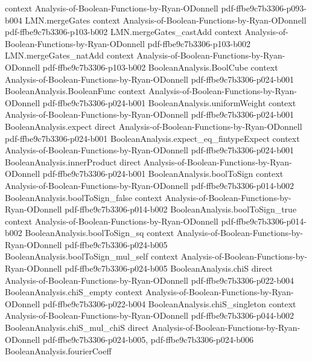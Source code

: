 \begin{lemma}
  {context}
  {Analysis-of-Boolean-Functions-by-Ryan-ODonnell}
  {pdf-ffbe9c7b3306-p093-b004}
\proofstep
  {LMN.mergeGates}
  {context}
  {Analysis-of-Boolean-Functions-by-Ryan-ODonnell}
  {pdf-ffbe9c7b3306-p103-b002}
\proofstep
  {LMN.mergeGates_castAdd}
  {context}
  {Analysis-of-Boolean-Functions-by-Ryan-ODonnell}
  {pdf-ffbe9c7b3306-p103-b002}
\proofstep
  {LMN.mergeGates_natAdd}
  {context}
  {Analysis-of-Boolean-Functions-by-Ryan-ODonnell}
  {pdf-ffbe9c7b3306-p103-b002}
\proofstep
  {BooleanAnalysis.BoolCube}
  {context}
  {Analysis-of-Boolean-Functions-by-Ryan-ODonnell}
  {pdf-ffbe9c7b3306-p024-b001}
\proofstep
  {BooleanAnalysis.BooleanFunc}
  {context}
  {Analysis-of-Boolean-Functions-by-Ryan-ODonnell}
  {pdf-ffbe9c7b3306-p024-b001}
\proofstep
  {BooleanAnalysis.uniformWeight}
  {context}
  {Analysis-of-Boolean-Functions-by-Ryan-ODonnell}
  {pdf-ffbe9c7b3306-p024-b001}
\proofstep
  {BooleanAnalysis.expect}
  {direct}
  {Analysis-of-Boolean-Functions-by-Ryan-ODonnell}
  {pdf-ffbe9c7b3306-p024-b001}
\proofstep
  {BooleanAnalysis.expect_eq_fintypeExpect}
  {context}
  {Analysis-of-Boolean-Functions-by-Ryan-ODonnell}
  {pdf-ffbe9c7b3306-p024-b001}
\proofstep
  {BooleanAnalysis.innerProduct}
  {direct}
  {Analysis-of-Boolean-Functions-by-Ryan-ODonnell}
  {pdf-ffbe9c7b3306-p024-b001}
\proofstep
  {BooleanAnalysis.boolToSign}
  {context}
  {Analysis-of-Boolean-Functions-by-Ryan-ODonnell}
  {pdf-ffbe9c7b3306-p014-b002}
\proofstep
  {BooleanAnalysis.boolToSign_false}
  {context}
  {Analysis-of-Boolean-Functions-by-Ryan-ODonnell}
  {pdf-ffbe9c7b3306-p014-b002}
\proofstep
  {BooleanAnalysis.boolToSign_true}
  {context}
  {Analysis-of-Boolean-Functions-by-Ryan-ODonnell}
  {pdf-ffbe9c7b3306-p014-b002}
\proofstep
  {BooleanAnalysis.boolToSign_sq}
  {context}
  {Analysis-of-Boolean-Functions-by-Ryan-ODonnell}
  {pdf-ffbe9c7b3306-p024-b005}
\proofstep
  {BooleanAnalysis.boolToSign_mul_self}
  {context}
  {Analysis-of-Boolean-Functions-by-Ryan-ODonnell}
  {pdf-ffbe9c7b3306-p024-b005}
\proofstep
  {BooleanAnalysis.chiS}
  {direct}
  {Analysis-of-Boolean-Functions-by-Ryan-ODonnell}
  {pdf-ffbe9c7b3306-p022-b004}
\proofstep
  {BooleanAnalysis.chiS_empty}
  {context}
  {Analysis-of-Boolean-Functions-by-Ryan-ODonnell}
  {pdf-ffbe9c7b3306-p022-b004}
\proofstep
  {BooleanAnalysis.chiS_singleton}
  {context}
  {Analysis-of-Boolean-Functions-by-Ryan-ODonnell}
  {pdf-ffbe9c7b3306-p044-b002}
\proofstep
  {BooleanAnalysis.chiS_mul_chiS}
  {direct}
  {Analysis-of-Boolean-Functions-by-Ryan-ODonnell}
  {pdf-ffbe9c7b3306-p024-b005,
    pdf-ffbe9c7b3306-p024-b006}
\proofstep
  {BooleanAnalysis.fourierCoeff}

\end{lemma}
